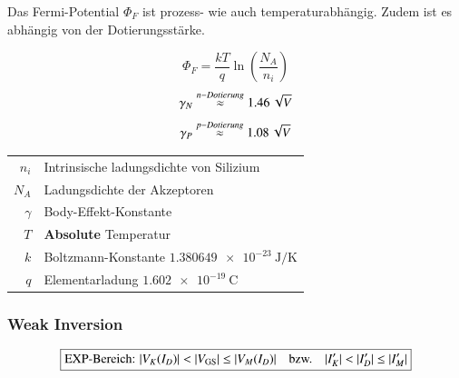\medskip

Das Fermi-Potential $\Phi_F$ ist prozess- wie auch temperaturabhängig. Zudem ist es abhängig von der Dotierungsstärke.

\begin{minipage}[c]{0.3\columnwidth}
    \[ \Phi_F = \frac{kT}{q} \ln \left( \frac{N_A}{n_i} \right) \]
    \[ \gamma_N \overset{n-Dotierung}{\approx} \qty{1.46}{\sqrt{\volt}} \]
    \[ \gamma_P \overset{p-Dotierung}{\approx} \qty{1.08}{\sqrt{\volt}} \]
\end{minipage}
\hfill
\begin{minipage}[c]{0.68\columnwidth}
    \begin{tabular}{rl}
        $n_i$       & Intrinsische ladungsdichte von Silizium   \\
        $N_A$       & Ladungsdichte der Akzeptoren              \\
        $\gamma$    & Body-Effekt-Konstante                     \\
        $T$         & \textbf{Absolute} Temperatur              \\
        $k$         & Boltzmann-Konstante $\qty{1.380649 e-23}{\joule\per\kelvin}$  \\
        $q$         & Elementarladung $\qty{1.602 e-19}{\coulomb}$
    \end{tabular}
\end{minipage}


\subsubsection{Weak Inversion}

\vspace{-0.3cm}

\[ \boxed{ \text{EXP-Bereich: } |V_K(I_D)| < |V_{\rm GS}| \leq |V_M(I_D)| \quad \text{bzw.} \quad |I_K'| < |I_D'| \leq |I_M'| } \]  %


